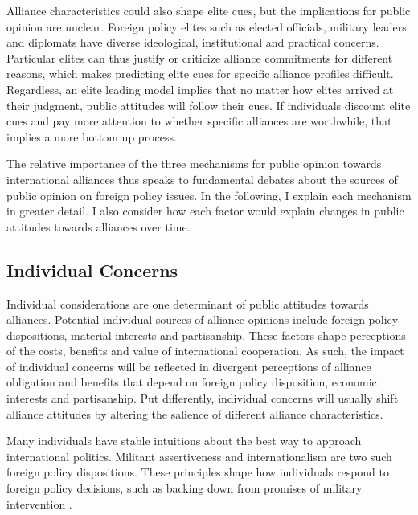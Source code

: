 \documentclass[12pt]{article}
\begin{document}
Alliance characteristics could also shape elite cues, but the implications for public opinion are unclear. 
Foreign policy elites such as elected officials, military leaders and diplomats have diverse ideological, institutional and practical concerns. 
Particular elites can thus justify or criticize alliance commitments for different reasons, which makes predicting elite cues for specific alliance profiles difficult. 
Regardless, an elite leading model implies that no matter how elites arrived at their judgment, public attitudes will follow their cues. 
If individuals discount elite cues and pay more attention to whether specific alliances are worthwhile, that implies a more bottom up process. 


The relative importance of the three mechanisms for public opinion towards international alliances thus speaks to fundamental debates about the sources of public opinion on foreign policy issues.  
In the following, I explain each mechanism in greater detail. 
I also consider how each factor would explain changes in public attitudes towards alliances over time. 


\subsection{Individual Concerns}


Individual considerations are one determinant of public attitudes towards alliances. 
Potential individual sources of alliance opinions include foreign policy dispositions, material interests and partisanship. 
These factors shape perceptions of the costs, benefits and value of international cooperation. 
As such, the impact of individual concerns will be reflected in divergent perceptions of alliance obligation and benefits that depend on foreign policy disposition, economic interests and partisanship. 
Put differently, individual concerns will usually shift alliance attitudes by altering the salience of different alliance characteristics. 


Many individuals have stable intuitions about the best way to approach international politics. 
Militant assertiveness and internationalism \citep{Herrmannetal1999} are two such foreign policy dispositions.  
These principles shape how individuals respond to foreign policy decisions, such as backing down from promises of military intervention \citep{KertzerBrutger2016}. 
\end{document}
